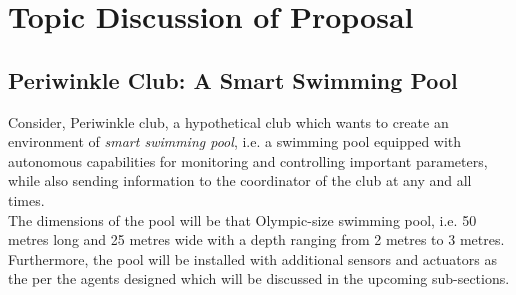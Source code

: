 \documentclass[12pt]{article}
\begin{document}
\section{Topic Discussion of Proposal}

    \subsection{Periwinkle Club: A Smart Swimming Pool}
    Consider, Periwinkle club, a hypothetical club which wants to create an environment of \textit{smart swimming pool}, i.e. a swimming pool equipped with autonomous capabilities for monitoring and controlling important parameters, while also sending information to the coordinator of the club at any and all times.\\
    The dimensions of the pool will be that Olympic-size swimming pool, i.e. 50 metres long and 25 metres wide with a depth ranging from 2 metres to 3 metres.\cite{poolDimension}\\
    Furthermore, the pool will be installed with additional sensors and actuators as the per the agents designed which will be discussed in the upcoming sub-sections.
    
\end{document}
